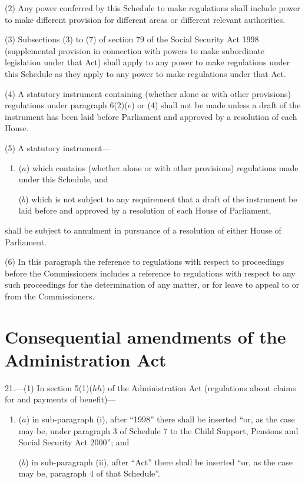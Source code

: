 \documentclass[12pt,a4paper]{article}
\begin{document}
(2) Any power conferred by this Schedule to make regulations shall include power to make different provision for different areas or different relevant authorities.

(3) Subsections (3)  to (7)  of section 79 of the Social Security Act 1998 (supplemental provision in connection with powers to make subordinate legislation under that Act) shall apply to any power to make regulations under this Schedule as they apply to any power to make regulations under that Act.

(4) A statutory instrument containing (whether alone or with other provisions) regulations under paragraph 6(2)($e$)  or (4)  shall not be made unless a draft of the instrument has been laid before Parliament and approved by a resolution of each House.

(5) A statutory instrument—
\begin{enumerate}\item[]
($a$) which contains (whether alone or with other provisions) regulations made under this Schedule, and

($b$) which is not subject to any requirement that a draft of the instrument be laid before and approved by a resolution of each House of Parliament,
\end{enumerate}
shall be subject to annulment in pursuance of a resolution of either House of Parliament.

(6) In this paragraph the reference to regulations with respect to proceedings before the Commissioners includes a reference to regulations with respect to any such proceedings for the determination of any matter, or for leave to appeal to or from the Commissioners.


\section*{Consequential amendments of the Administration Act}

21.---(1) In section 5(1)($hh$)  of the Administration Act (regulations about claims for and payments of benefit)—
\begin{enumerate}\item[]
($a$) in sub-paragraph (i), after “1998” there shall be inserted “or, as the case may be, under paragraph 3 of Schedule 7 to the Child Support, Pensions and Social Security Act 2000”; and

($b$) in sub-paragraph (ii), after “Act” there shall be inserted “or, as the case may be, paragraph 4 of that Schedule”.
\end{enumerate}
\end{document}
